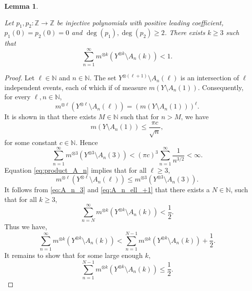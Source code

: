 \documentclass[12pt,reqno]{amsart}
\newcommand{\N}{\mathbb{N}}
\newcommand{\Z}{\mathbb{Z}}
\newtheorem{lemma}[thm]{Lemma}
\theoremstyle{definition}
\begin{document}
\begin{lemma}\label{lem:A_n_k<1}

Let $p_1,p_2:\Z\to\Z$ be injective polynomials with positive leading coefficient, $p_1(0) = p_2(0) = 0$ and $\deg (p_1),\deg (p_2) \geq 2$. There exists $k \geq 3$ such that
\[
\sum_{n=1}^{\infty} m^{\otimes k}(Y^{\otimes k} \setminus A_n(k))<1. 
\]
\end{lemma}

\begin{proof} Let $\ell \in \N$ and $n\in \N$. The set $Y^{\otimes (\ell+1)} \setminus A_n(\ell)$ is an intersection of $\ell$ independent events, each of which if of measure $m(Y\setminus A_n(1))$. Consequently, for every $\ell, n\in \N$,
\begin{equation}\label{eq:product_A_n}
    m^{\otimes \ell}(Y^{\otimes \ell} \setminus A_n(\ell)) =\left(m(Y\setminus A_n(1))\right)^\ell.
\end{equation}
It is shown in \cite[page 21]{kosloff_Sanadhya_2024} that there exists $M \in \N$ such that for $n > M$, we have
\begin{equation}\label{eq:Bound_An3}
   m(Y \setminus A_n(1)) \leq \dfrac{\pi c}{\sqrt{n}},
\end{equation}
for some constant $c \in \N$. Hence 
\begin{equation}\label{eq:A_n_3}
\sum_{n=1}^{\infty} m^{\otimes 3}(Y^{\otimes 3} \setminus A_n(3))< (\pi c)^3 \sum_{n=1}^{\infty} \dfrac{1}{n^{3/2}} < \infty. 
\end{equation}
Equation \eqref{eq:product_A_n} implies that for all $\ell\geq 3$, 
\begin{equation}\label{eq:A_n_ell_+1} 
 m^{\otimes \ell}(Y^{\otimes \ell} \setminus A_n(\ell)) \leq  m^{\otimes 3}(Y^{\otimes 3} \setminus A_n(3)).     
\end{equation}
It follows from \eqref{eq:A_n_3} and \eqref{eq:A_n_ell_+1} that there exists a $N \in \N$, such that for all $k\geq 3$,
\[
\sum_{n=N}^{\infty} m^{\otimes k}(Y^{\otimes k} \setminus A_n(k)) < \dfrac{1}{2}. 
\] Thus we have,
\[
\sum_{n=1}^{\infty} m^{\otimes k}(Y^{\otimes k} \setminus A_n(k)) < \sum_{n=1}^{N-1} m^{\otimes k}(Y^{\otimes k} \setminus A_n(k)) + \frac{1}{2}.
\] 
It remains to show that for some large enough $k$, 
\[
\sum_{n=1}^{N-1} m^{\otimes k}(Y^{\otimes k} \setminus A_n(k))\leq \frac{1}{2}.
\]
\end{proof}
\end{document}
